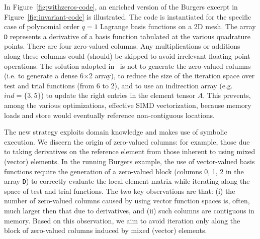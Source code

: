In Figure~\ref{fig:withzeros-code}, an enriched version of the Burgers excerpt in Figure~\ref{fig:invariant-code} is illustrated. The code is instantiated for the specific case of polynomial order $q=1$ Lagrange basis functions on a 2D mesh. The array \texttt{D} represents a derivative of a basis function tabulated at the various quadrature points. There are four zero-valued columns. Any multiplications or additions along these columns could (should) be skipped to avoid irrelevant floating point operations. The solution adopted in~\cite{quadrature-olegaard} is not to generate the zero-valued columns (i.e. to generate a dense 6$\times$2 array), to reduce the size of the iteration space over test and trial functions (from 6 to 2), and to use an indirection array (e.g. $ind = \lbrace 3, 5\rbrace$) to update the right entries in the element tensor $A$. This prevents, among the various optimizations, effective SIMD vectorization, because memory loads and store would eventually reference non-contiguous locations. 

The new strategy exploits domain knowledge and makes use of symbolic execution. We discern the origin of zero-valued columns: for example, those due to taking derivatives on the reference element from those inherent to using mixed (vector) elements. In the running Burgers example, the use of vector-valued basis functions require the generation of a zero-valued block (columns 0, 1, 2 in the array \texttt{D}) to correctly evaluate the local element matrix while iterating along the space of test and trial functions. The two key observations are that: (i) the number of zero-valued columns caused by using vector function spaces is, often, much larger then that due to derivatives, and (ii) such columns are contiguous in memory. Based on this observation, we aim to avoid iteration only along the block of zero-valued columns induced by mixed (vector) elements. 


